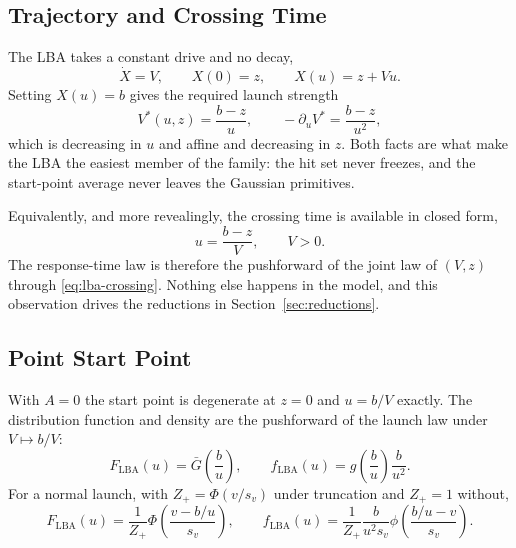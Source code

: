 \documentclass[12pt]{article}
\newcommand{\PhiN}{\Phi}
\newcommand{\phiN}{\phi}
\newcommand{\Gbar}{\bar{G}}
\theoremstyle{remark}
\begin{document}
\subsection{Trajectory and Crossing Time}
The LBA takes a constant drive and no decay,
\begin{equation}
  \dot X = V, \qquad X(0) = z, \qquad X(u) = z + Vu.
  \label{eq:lba-traj}
\end{equation}
Setting $X(u) = b$ gives the required launch strength
\begin{equation}
  V^{*}(u,z) = \frac{b-z}{u},
  \qquad
  -\partial_u V^{*} = \frac{b-z}{u^2},
  \label{eq:lba-vstar}
\end{equation}
which is decreasing in $u$ and affine and decreasing in $z$. Both facts are what make the LBA the easiest member of the family: the hit set never freezes, and the start-point average never leaves the Gaussian primitives.

Equivalently, and more revealingly, the crossing time is available in closed form,
\begin{equation}
  u = \frac{b-z}{V}, \qquad V > 0.
  \label{eq:lba-crossing}
\end{equation}
The response-time law is therefore the pushforward of the joint law of $(V,z)$ through \eqref{eq:lba-crossing}. Nothing else happens in the model, and this observation drives the reductions in Section~\ref{sec:reductions}.

\subsection{Point Start Point}
With $A = 0$ the start point is degenerate at $z = 0$ and $u = b/V$ exactly. The distribution function and density are the pushforward of the launch law under $V \mapsto b/V$:
\begin{equation}
  F_{\mathrm{LBA}}(u) = \Gbar\!\left(\frac{b}{u}\right),
  \qquad
  f_{\mathrm{LBA}}(u) = g\!\left(\frac{b}{u}\right)\frac{b}{u^2}.
  \label{eq:lba-point}
\end{equation}
For a normal launch, with $Z_+ = \PhiN(v/s_v)$ under truncation and $Z_+ = 1$ without,
\begin{equation}
  F_{\mathrm{LBA}}(u) = \frac{1}{Z_+}\PhiN\!\left(\frac{v - b/u}{s_v}\right),
  \qquad
  f_{\mathrm{LBA}}(u) = \frac{1}{Z_+}\frac{b}{u^2 s_v}
     \phiN\!\left(\frac{b/u - v}{s_v}\right).
\end{equation}
\end{document}

